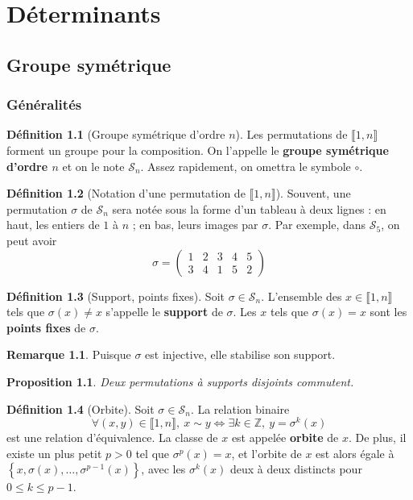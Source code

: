 \documentclass[french]{book}
\newcommand{\Z}{\mathbb{Z}}
\theoremstyle{plain}
\newtheorem{prop}{Proposition}[chapter]
\theoremstyle{definition}
\newtheorem{dfn}{Définition}[chapter]
\newtheorem{rmq}{Remarque}[chapter]
\theoremstyle{remark}
\begin{document}
\newpage
\chapter{Déterminants}
\section{Groupe symétrique}
\subsection{Généralités}
\begin{dfn}[Groupe symétrique d'ordre $n$]
	Les permutations de $\llbracket1,n\rrbracket$ forment un groupe pour la composition. On l'appelle le \textbf{groupe symétrique d'ordre $n$} et on le note $\mathcal{S}_n$. Assez rapidement, on omettra le symbole $\circ$.
\end{dfn}
\begin{dfn}[Notation d'une permutation de $\llbracket1,n\rrbracket$]
	Souvent, une permutation $\sigma$ de $\mathcal{S}_n$ sera notée sous la forme d'un tableau à deux lignes : en haut, les entiers de $1$ à $n$ ; en bas, leurs images par $\sigma$. Par exemple, dans $\mathcal{S}_5$, on peut avoir $$\sigma =\begin{pmatrix}1&2&3&4&5\\3&4&1&5&2\end{pmatrix}$$
\end{dfn}
\begin{dfn}[Support, points fixes]
	Soit $\sigma\in\mathcal{S}_n$. L'ensemble des $x\in\llbracket1,n\rrbracket$ tels que $\sigma(x)\ne x$ s'appelle le \textbf{support} de $\sigma$. Les $x$ tels que $\sigma(x)=x$ sont les \textbf{points fixes} de $\sigma$.
\end{dfn}
\begin{rmq} Puisque $\sigma$ est injective, elle stabilise son support. \end{rmq}
\begin{prop}
	Deux permutations à supports disjoints commutent.
\end{prop}
\begin{dfn}[Orbite]
	Soit $\sigma\in\mathcal{S}_n$. La relation binaire $$\forall (x,y)\in\llbracket1,n\rrbracket,\ x\sim y \iff \exists k\in\Z,\ y=\sigma^k(x)$$ est une relation d'équivalence. La classe de $x$ est appelée \textbf{orbite} de $x$. De plus, il existe un plus petit $p>0$ tel que $\sigma^p(x)=x$, et l'orbite de $x$ est alors égale à $\left\{x,\sigma(x),\ldots,\sigma^{p-1}(x)\right\}$, avec les $\sigma^k(x)$ deux à deux distincts pour $0\leqslant k\leqslant p-1$.
\end{dfn}
\end{document}
